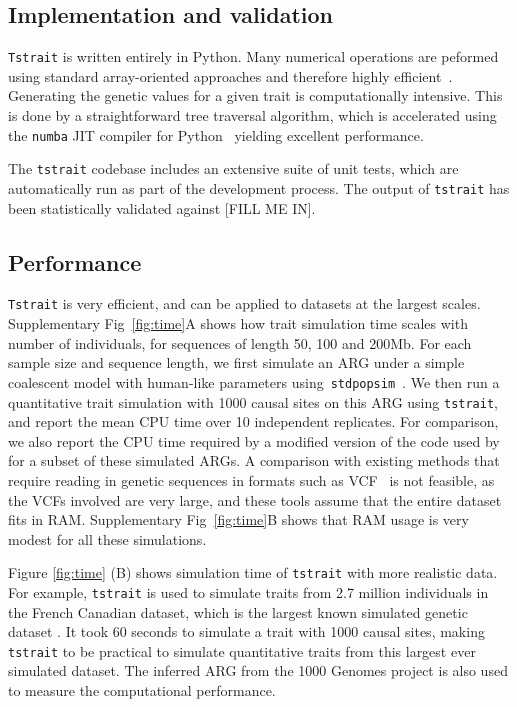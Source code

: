 \documentclass[unnumsec,webpdf,modern,large,namedate]{oup-authoring-template}%
\begin{document}

\subsection{Implementation and validation}
\texttt{Tstrait} is written entirely in Python. Many numerical operations are
peformed using standard array-oriented approaches and therefore
highly efficient~\citep{numpy}. Generating the genetic values for a given
trait is computationally intensive. This is done by a
straightforward tree traversal algorithm, which is
accelerated using the \texttt{numba} JIT compiler for Python~\citep{numba} yielding
excellent performance.

The \texttt{tstrait} codebase includes an extensive suite of unit tests,
which are automatically run as part of the development process. The
output of \texttt{tstrait} has been statistically validated against
[FILL ME IN].

\subsection{Performance}
\texttt{Tstrait} is very efficient, and can be applied to datasets at the
largest scales.
Supplementary Fig~\ref{fig:time}A shows how trait simulation time scales
with number of individuals, for sequences of length 50, 100 and 200Mb.
For each sample size and sequence length,
we first simulate an ARG under a simple coalescent model with
human-like parameters using~\texttt{stdpopsim}~\citep{adrion2020}.
We then run a quantitative trait simulation
with 1000 causal sites on this ARG using \texttt{tstrait},
and report the mean CPU time over 10 independent replicates.
For comparison, we also report the CPU time required by a
modified version of the code used by \citet{martin2017} for a
subset of these simulated ARGs.
A comparison with existing methods that require reading
in genetic sequences in formats such as
VCF~\citep[e.g.][]{meyer2018,fernandes2020} is not feasible,
as the VCFs involved are very large, and these tools assume that
the entire dataset fits in RAM.
Supplementary Fig~\ref{fig:time}B shows that RAM usage is very
modest for all these simulations.

Figure \ref{fig:time} (B) shows simulation time of \texttt{tstrait} with more
realistic data. For example, \texttt{tstrait} is used to simulate traits from
2.7 million individuals in the French Canadian dataset, which is the largest
known simulated genetic dataset \citep{anderson2023}. It took 60 seconds to
simulate a trait with 1000 causal sites, making \texttt{tstrait} to be
practical to simulate quantitative traits from this largest ever simulated
dataset. The inferred ARG from the 1000 Genomes project \citep{kelleher2019} is
also used to measure the computational performance.
\end{document}

